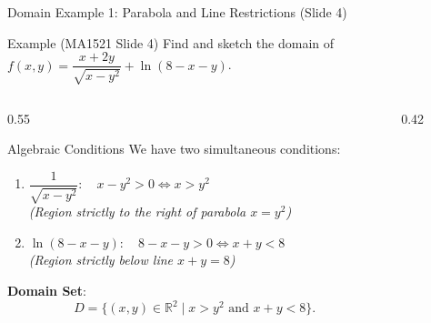 \documentclass[aspectratio=169,10pt]{beamer}
\begin{document}
\begin{frame}{Domain Example 1: Parabola and Line Restrictions (Slide 4)}
  \begin{exampleblock}{Example (MA1521 Slide 4)}
    Find and sketch the domain of $f(x, y) = \dfrac{x + 2y}{\sqrt{x - y^2}} + \ln(8 - x - y)$.
  \end{exampleblock}

  \begin{columns}[T]
    \begin{column}{0.55\textwidth}
      \begin{block}{Algebraic Conditions}
        \footnotesize
        We have two simultaneous conditions:
        \begin{enumerate}
          \item $\dfrac{1}{\sqrt{x - y^2}}: \quad x - y^2 > 0 \iff x > y^2$\\
          \textit{(Region strictly to the right of parabola $x = y^2$)}
          \item $\ln(8 - x - y): \quad 8 - x - y > 0 \iff x + y < 8$\\
          \textit{(Region strictly below line $x + y = 8$)}
        \end{enumerate}
        \textbf{Domain Set}:
        \[
          D = \{(x, y) \in \mathbb{R}^2 \mid x > y^2 \text{ and } x + y < 8\}.
        \]
      \end{block}
    \end{column}

    \begin{column}{0.42\textwidth}
      \centering
    \end{column}
  \end{columns}
\end{frame}
\end{document}
